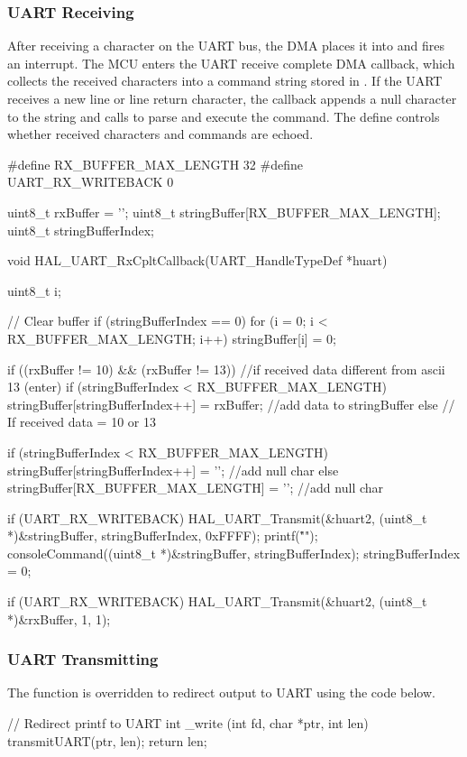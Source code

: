 \subsubsection{UART Receiving}
After receiving a character on the UART bus, the DMA places it into  and fires an interrupt. The MCU enters the UART receive complete DMA callback,  which collects the received characters into a command string stored in . If the UART receives a new line or line return character, the callback appends a null character to the string and calls  to parse and execute the command. The define  controls whether received characters and commands are echoed.
\begin{clisting}[caption={UART Receive Callback},label={list:uart_receive}]
#define RX_BUFFER_MAX_LENGTH 32 
#define UART_RX_WRITEBACK 0

uint8_t rxBuffer = '';
uint8_t stringBuffer[RX_BUFFER_MAX_LENGTH];
uint8_t stringBufferIndex;

void HAL_UART_RxCpltCallback(UART_HandleTypeDef *huart)
{
    uint8_t i;

    // Clear buffer
    if (stringBufferIndex == 0) {for (i = 0; i < RX_BUFFER_MAX_LENGTH; i++) stringBuffer[i] = 0;}	

    if ((rxBuffer != 10) && (rxBuffer != 13))	//if received data different from ascii 13 (enter)
    {
        if (stringBufferIndex < RX_BUFFER_MAX_LENGTH){
            stringBuffer[stringBufferIndex++] = rxBuffer; //add data to stringBuffer
        }
    }
    else // If received data = 10 or 13
    {
        if (stringBufferIndex < RX_BUFFER_MAX_LENGTH){
            stringBuffer[stringBufferIndex++] = '\0'; //add null char
        } else {
            stringBuffer[RX_BUFFER_MAX_LENGTH] = '\0'; //add null char
        }

        if (UART_RX_WRITEBACK){
            HAL_UART_Transmit(&huart2, (uint8_t *)&stringBuffer, stringBufferIndex, 0xFFFF);
            printf("\r\n");
        }
        consoleCommand((uint8_t *)&stringBuffer, stringBufferIndex);
        stringBufferIndex = 0;
    }

    if (UART_RX_WRITEBACK){
        HAL_UART_Transmit(&huart2, (uint8_t *)&rxBuffer, 1, 1);
    }
}
\end{clisting}

\subsubsection{UART Transmitting}
The  function is overridden to redirect  output to UART using the code below.
\begin{clisting}[caption={Redirect printf()},label={list:redirect_printf}]
// Redirect printf to UART
int _write (int fd, char *ptr, int len) 
{ 
	transmitUART(ptr, len);
	return len; 
}
\end{clisting}

